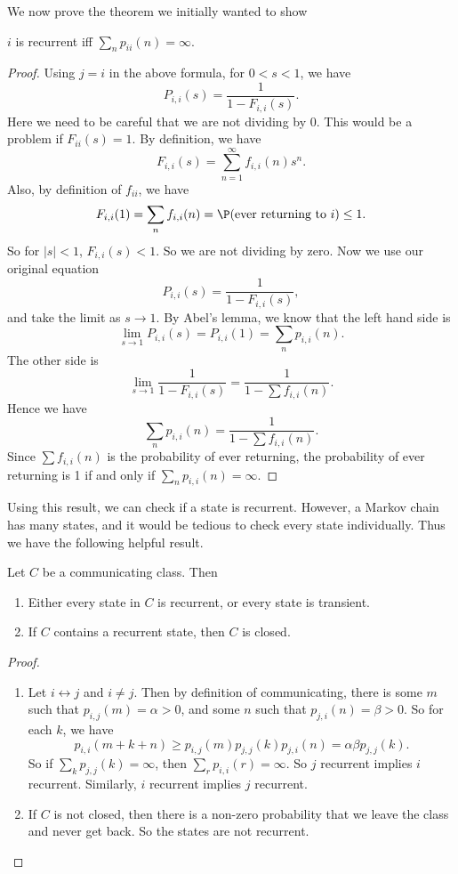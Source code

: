 \documentclass[a4paper]{article}
\begin{document}
We now prove the theorem we initially wanted to show
\begin{thm}
  $i$ is recurrent iff $\sum_n p_{ii}(n) = \infty$.
\end{thm}

\begin{proof}
  Using $j = i$ in the above formula, for $0 < s < 1$, we have
  \[
    P_{i, i}(s) = \frac{1}{1 - F_{i, i} (s)}.
  \]
  Here we need to be careful that we are not dividing by $0$. This would be a problem if $F_{ii}(s) = 1$. By definition, we have
  \[
    F_{i, i}(s) = \sum_{n = 1}^\infty f_{i, i}(n) s^n.
  \]
  Also, by definition of $f_{ii}$, we have
  \[
    F_{i, i}(1) = \sum_n f_{i, i}(n) = \P(\text{ever returning to }i) \leq 1.
  \]
  So for $|s| < 1$, $F_{i, i}(s) < 1$. So we are not dividing by zero. Now we use our original equation
  \[
    P_{i, i}(s) = \frac{1}{1 - F_{i, i} (s)},
  \]
  and take the limit as $s \to 1$. By Abel's lemma, we know that the left hand side is
  \[
    \lim_{s \to 1}P_{i, i}(s) = P_{i, i}(1) = \sum_n p_{i, i}(n).
  \]
  The other side is
  \[
    \lim_{s \to 1}\frac{1}{1 - F_{i, i}(s)} = \frac{1}{1 - \sum f_{i, i}(n)}.
  \]
  Hence we have
  \[
    \sum_n p_{i, i}(n) = \frac{1}{1 - \sum f_{i, i}(n)}.
  \]
  Since $\sum f_{i, i}(n)$ is the probability of ever returning, the probability of ever returning is 1 if and only if $\sum_n p_{i, i}(n) = \infty$.
\end{proof}

Using this result, we can check if a state is recurrent. However, a Markov chain has many states, and it would be tedious to check every state individually. Thus we have the following helpful result.
\begin{thm}
  Let $C$ be a communicating class. Then
  \begin{enumerate}
    \item Either every state in $C$ is recurrent, or every state is transient.
    \item If $C$ contains a recurrent state, then $C$ is closed.
  \end{enumerate}
\end{thm}

\begin{proof}\leavevmode
  \begin{enumerate}
    \item Let $i \leftrightarrow j$ and $i \not =j$. Then by definition of communicating, there is some $m$ such that $p_{i, j}(m) = \alpha > 0$, and some $n$ such that $p_{j, i}(n) = \beta > 0$. So for each $k$, we have
      \[
        p_{i, i}(m + k + n) \geq p_{i, j}(m) p_{j, j}(k) p_{j, i}(n) = \alpha\beta p_{j, j}(k).
      \]
      So if $\sum_k p_{j, j}(k) = \infty$, then $\sum_r p_{i, i}(r) = \infty$. So $j$ recurrent implies $i$ recurrent. Similarly, $i$ recurrent implies $j$ recurrent.
    \item If $C$ is not closed, then there is a non-zero probability that we leave the class and never get back. So the states are not recurrent.
  \end{enumerate}
\end{proof}
\end{document}
